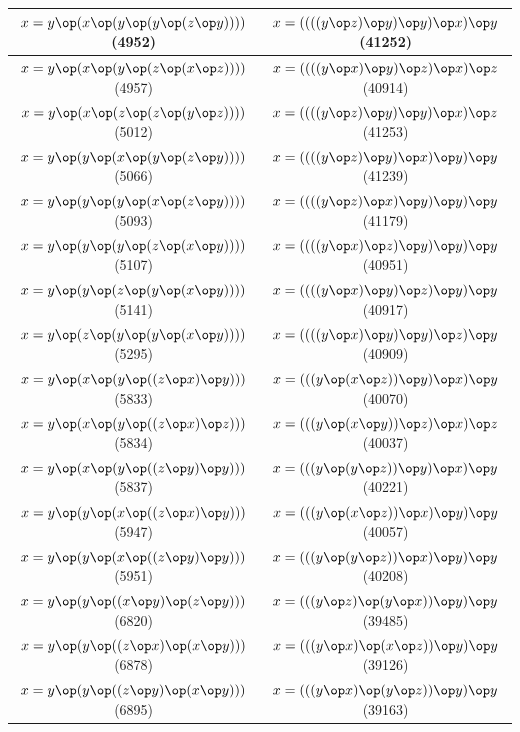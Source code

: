 \begin{table}[h]
\begin{tabular}{|c|c|}
\hline
$x = y \op (x \op (y \op (y \op (z \op y))))$ (4952) & $x = ((((y \op z) \op y) \op y) \op x) \op y$ (41252) \\ \hline
$x = y \op (x \op (y \op (z \op (x \op z))))$ (4957) & $x = ((((y \op x) \op y) \op z) \op x) \op z$ (40914) \\ \hline
$x = y \op (x \op (z \op (z \op (y \op z))))$ (5012) & $x = ((((y \op z) \op y) \op y) \op x) \op z$ (41253) \\ \hline
$x = y \op (y \op (x \op (y \op (z \op y))))$ (5066) & $x = ((((y \op z) \op y) \op x) \op y) \op y$ (41239) \\ \hline
$x = y \op (y \op (y \op (x \op (z \op y))))$ (5093) & $x = ((((y \op z) \op x) \op y) \op y) \op y$ (41179) \\ \hline
$x = y \op (y \op (y \op (z \op (x \op y))))$ (5107) & $x = ((((y \op x) \op z) \op y) \op y) \op y$ (40951) \\ \hline
$x = y \op (y \op (z \op (y \op (x \op y))))$ (5141) & $x = ((((y \op x) \op y) \op z) \op y) \op y$ (40917) \\ \hline
$x = y \op (z \op (y \op (y \op (x \op y))))$ (5295) & $x = ((((y \op x) \op y) \op y) \op z) \op y$ (40909) \\ \hline
$x = y \op (x \op (y \op ((z \op x) \op y)))$ (5833) & $x = (((y \op (x \op z)) \op y) \op x) \op y$ (40070) \\ \hline
$x = y \op (x \op (y \op ((z \op x) \op z)))$ (5834) & $x = (((y \op (x \op y)) \op z) \op x) \op z$ (40037) \\ \hline
$x = y \op (x \op (y \op ((z \op y) \op y)))$ (5837) & $x = (((y \op (y \op z)) \op y) \op x) \op y$ (40221) \\ \hline
$x = y \op (y \op (x \op ((z \op x) \op y)))$ (5947) & $x = (((y \op (x \op z)) \op x) \op y) \op y$ (40057) \\ \hline
$x = y \op (y \op (x \op ((z \op y) \op y)))$ (5951) & $x = (((y \op (y \op z)) \op x) \op y) \op y$ (40208) \\ \hline
$x = y \op (y \op ((x \op y) \op (z \op y)))$ (6820) & $x = (((y \op z) \op (y \op x)) \op y) \op y$ (39485) \\ \hline
$x = y \op (y \op ((z \op x) \op (x \op y)))$ (6878) & $x = (((y \op x) \op (x \op z)) \op y) \op y$ (39126) \\ \hline
$x = y \op (y \op ((z \op y) \op (x \op y)))$ (6895) & $x = (((y \op x) \op (y \op z)) \op y) \op y$ (39163) \\ \hline

\end{tabular}
\end{table}
